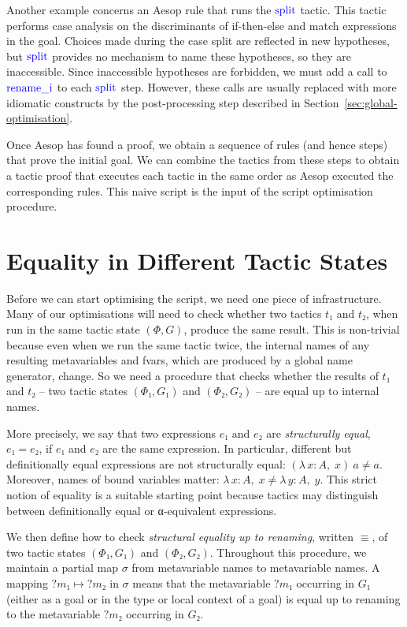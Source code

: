 \documentclass[sigplan,10pt,anonymous,review]{acmart}
\newcommand{\tac}[1]{\ensuremath{\mathrm{\mathcolor{blue}{#1}}}}
\newcommand{\Lam}[2]{λ\,#1,\; #2}
\newcommand{\mvar}[1]{{?#1}}
\begin{document}
Another example concerns an Aesop rule that runs the \tac{split} tactic.
This tactic performs case analysis on the discriminants of if-then-else and match expressions in the goal.
Choices made during the case split are reflected in new hypotheses, but \tac{split} provides no mechanism to name these hypotheses, so they are inaccessible.
Since inaccessible hypotheses are forbidden, we must add a call to \tac{rename\_i} to each \tac{split} step.
However, these calls are usually replaced with more idiomatic constructs by the post-processing step described in Section~\ref{sec:global-optimisation}.

\medskip

Once Aesop has found a proof, we obtain a sequence of rules (and hence steps) that prove the initial goal.
We can combine the tactics from these steps to obtain a tactic proof that executes each tactic in the same order as Aesop executed the corresponding rules.
This naive script is the input of the script optimisation procedure.

\section{Equality in Different Tactic States}%
\label{sec:equality}

Before we can start optimising the script, we need one piece of infrastructure.
Many of our optimisations will need to check whether two tactics $t₁$ and $t₂$, when run in the same tactic state $(Φ, G)$, produce the same result.
This is non-trivial because even when we run the same tactic twice, the internal names of any resulting metavariables and fvars, which are produced by a global name generator, change.
So we need a procedure that checks whether the results of $t₁$ and $t₂$ -- two tactic states $(Φ₁, G₁)$ and $(Φ₂, G₂)$ -- are equal up to internal names.

More precisely, we say that two expressions $e₁$ and $e₂$ are \emph{structurally equal}, $e₁ = e₂$, if $e₁$ and $e₂$ are the same expression.
In particular, different but definitionally equal expressions are not structurally equal: $(\Lam{x : A}{x})~a ≠ a$.
Moreover, names of bound variables matter: $\Lam{x : A}{x} ≠ \Lam{y : A}{y}$.
This strict notion of equality is a suitable starting point because tactics may distinguish between definitionally equal or α-equivalent expressions.

We then define how to check \emph{structural equality up to renaming}, written $≡$, of two tactic states $(Φ₁, G₁)$ and $(Φ₂, G₂)$.
Throughout this procedure, we maintain a partial map $σ$ from metavariable names to metavariable names.
A mapping $\mvar{m₁} ↦ \mvar{m₂}$ in $σ$ means that the metavariable $\mvar{m₁}$ occurring in $G₁$ (either as a goal or in the type or local context of a goal) is equal up to renaming to the metavariable $\mvar{m₂}$ occurring in $G₂$.
\end{document}
